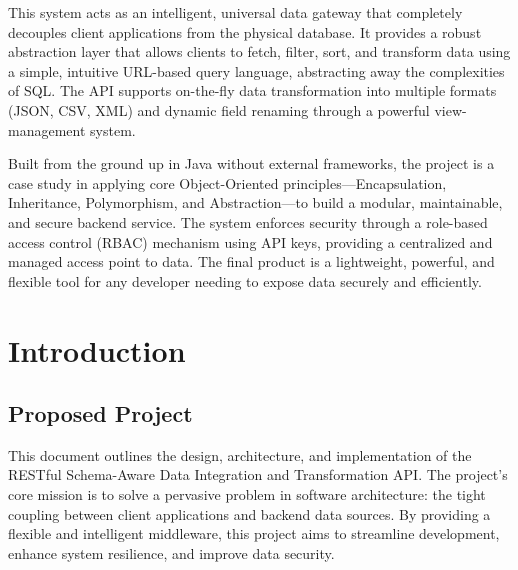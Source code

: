 \documentclass[12pt, a4paper]{report}
\begin{document}
This system acts as an intelligent, universal data gateway that completely decouples client applications from the physical database. It provides a robust abstraction layer that allows clients to fetch, filter, sort, and transform data using a simple, intuitive URL-based query language, abstracting away the complexities of SQL. The API supports on-the-fly data transformation into multiple formats (JSON, CSV, XML) and dynamic field renaming through a powerful view-management system.

Built from the ground up in Java without external frameworks, the project is a case study in applying core Object-Oriented principles—Encapsulation, Inheritance, Polymorphism, and Abstraction—to build a modular, maintainable, and secure backend service. The system enforces security through a role-based access control (RBAC) mechanism using API keys, providing a centralized and managed access point to data. The final product is a lightweight, powerful, and flexible tool for any developer needing to expose data securely and efficiently.

\newpage

\pagestyle{fancy} %

\tableofcontents
\newpage

\listoffigures
\newpage

\listoftables %
\newpage

\cleardoublepage
{}

\chapter{Introduction}
\section{Proposed Project}
This document outlines the design, architecture, and implementation of the RESTful Schema-Aware Data Integration and Transformation API. The project's core mission is to solve a pervasive problem in software architecture: the tight coupling between client applications and backend data sources. By providing a flexible and intelligent middleware, this project aims to streamline development, enhance system resilience, and improve data security.
\end{document}
